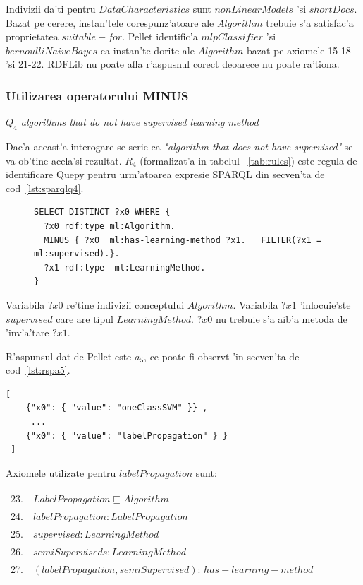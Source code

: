 \documentclass[12pt,a4paper,twoside]{report}
\begin{document}
Indivizii da'ti pentru $DataCharacteristics$ sunt $nonLinearModels$ 'si $shortDocs$. Bazat pe cerere, instan'tele corespunz'atoare ale $Algorithm$ trebuie s'a satisfac'a proprietatea $suitable-for$. Pellet identific'a $mlpClassifier$ 'si $bernoulliNaiveBayes$ ca instan'te dorite ale $Algorithm$ bazat pe axiomele 15-18 'si 21-22. 
RDFLib nu poate afla r'aspusnul corect deoarece nu poate ra'tiona.
\subsubsection{Utilizarea operatorului MINUS}
{\it $Q_4$ algorithms that do not have supervised learning method}

Dac'a aceast'a interogare se scrie ca {\it"algorithm that does not have supervised"} se va ob'tine acela'si rezultat. $R_4$ (formalizat'a in tabelul ~\ref{tab:rules}) este regula de identificare Quepy pentru urm'atoarea expresie SPARQL din secven'ta de cod~\ref{lst:sparqlq4}.

\begin{figure}[h]
\begin{footnotesize}
\begin{lstlisting}[captionpos=b, caption=Q4 SPARQL query, label=lst:sparqlq4,  basicstyle=\ttfamily,frame=single]
SELECT DISTINCT ?x0 WHERE {
  ?x0 rdf:type ml:Algorithm.
  MINUS { ?x0  ml:has-learning-method ?x1.   FILTER(?x1 = ml:supervised).}.
  ?x1 rdf:type  ml:LearningMethod.
}
\end{lstlisting}
\end{footnotesize}
\end{figure}
Variabila $?x0$ re'tine indivizii conceptului $Algorithm$. Variabila $?x1$ 'inlocuie'ste $supervised$ care are tipul $LearningMethod$. $?x0$ nu trebuie s'a aib'a metoda de 'inv'a'tare $?x1$.

R'aspunsul dat de Pellet este $a_5$, ce poate fi observt 'in secven'ta de cod~\ref{lst:rspa5}.

\begin{lstlisting}[basicstyle=\footnotesize, caption=R'aspunsul $a_5$ la 'intrebarea $Q_4$, label=lst:rspa5]
[
    {"x0": { "value": "oneClassSVM" }} ,
     ...
    {"x0": { "value": "labelPropagation" } }
 ]
\end{lstlisting}

Axiomele utilizate pentru $labelPropagation$ sunt:

\vspace*{0.3cm}
\begin{small}
\begin{tabular}{ll}
23. & $LabelPropagation  \sqsubseteq Algorithm$\\
24. & $labelPropagation:LabelPropagation$\\
25. & $supervised: LearningMethod$\\
26. & $semiSuperviseds: LearningMethod$\\
27. & $(labelPropagation, semiSupervised)$: $has-learning-method$\\
\end{tabular}
\end{small}
\vspace*{0.3cm}
\end{document}
